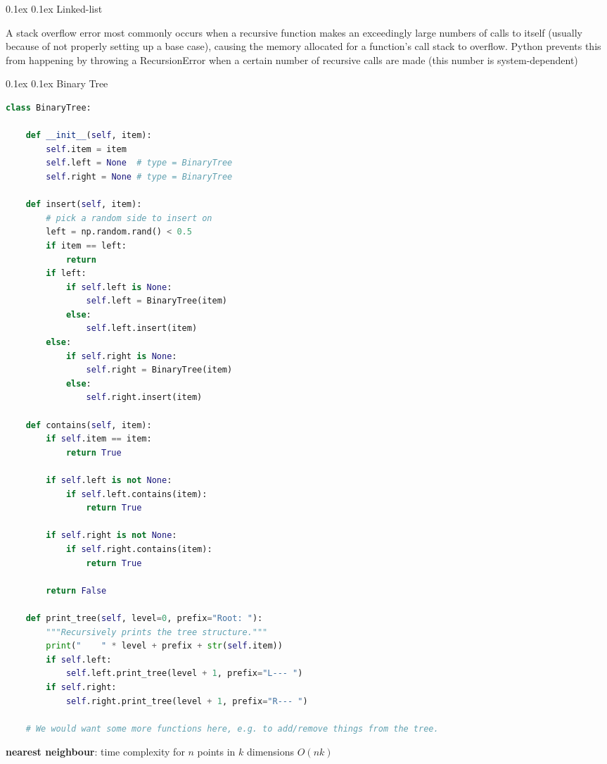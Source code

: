 \documentclass[8pt,landscape]{article}
\makeatletter
\renewcommand{\subsection}{\@startsection{subsection}{2}{0pt}%
    {0.1ex}%
    {0.1ex}%
    {\fontsize{8}{9}\bfseries\color{blue}}} %
\newcommand{\smalltext}[1]{%
  {\fontsize{8}{9}\selectfont\sloppy #1\par}%
}
\makeatother
\begin{document}
\begin{multicols}{3}
\subsection{Linked-list}
\smalltext{
A stack overflow error most commonly occurs when a recursive function makes an exceedingly large numbers of calls to itself (usually because of not properly setting up a base case), causing the memory allocated for a function’s call stack to overflow.
Python prevents this from happening by throwing a RecursionError when a certain number of recursive calls are made (this number is system-dependent)
}

\subsection{Binary Tree}
\begin{lstlisting}[language=Python]
class BinaryTree:
    
    def __init__(self, item):
        self.item = item
        self.left = None  # type = BinaryTree
        self.right = None # type = BinaryTree
    
    def insert(self, item):
        # pick a random side to insert on
        left = np.random.rand() < 0.5
        if item == left:
            return
        if left:
            if self.left is None:
                self.left = BinaryTree(item)
            else:
                self.left.insert(item)
        else:
            if self.right is None:
                self.right = BinaryTree(item)
            else:
                self.right.insert(item)
    
    def contains(self, item):
        if self.item == item:
            return True
        
        if self.left is not None:
            if self.left.contains(item):
                return True

        if self.right is not None:
            if self.right.contains(item):
                return True

        return False
    
    def print_tree(self, level=0, prefix="Root: "):
        """Recursively prints the tree structure."""
        print("    " * level + prefix + str(self.item))
        if self.left:
            self.left.print_tree(level + 1, prefix="L--- ")
        if self.right:
            self.right.print_tree(level + 1, prefix="R--- ")
    
    # We would want some more functions here, e.g. to add/remove things from the tree.
\end{lstlisting}
\textbf{nearest neighbour}: time complexity for $n$ points in $k$ dimensions $O(nk)$ \\


\end{multicols}
\end{document}
